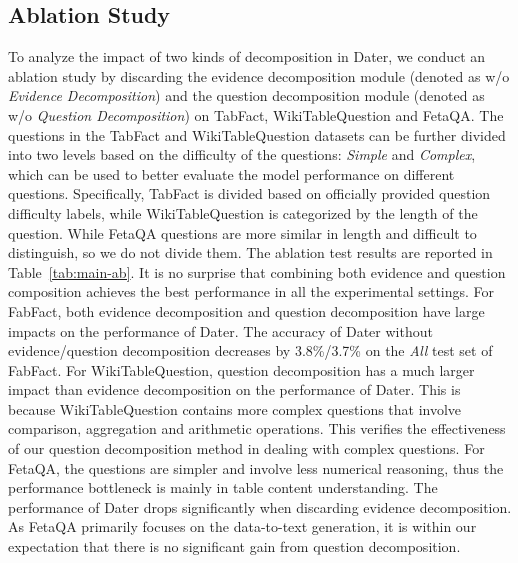 \documentclass{article}
\begin{document}
\subsection{Ablation Study}
To analyze the impact of two kinds of decomposition in Dater, we conduct an ablation study by discarding the evidence decomposition module (denoted as w/o \textit{Evidence Decomposition}) and the question decomposition module (denoted as w/o \textit{Question Decomposition}) on TabFact, WikiTableQuestion and FetaQA. The questions in the TabFact and WikiTableQuestion datasets can be further divided into two levels based on the difficulty of the questions:  \textit{Simple} and \textit{Complex}, which can be used to better evaluate the model performance on different questions. 
Specifically, TabFact is divided based on officially provided question difficulty labels, while WikiTableQuestion is categorized by the length of the question.  
While FetaQA questions are more similar in length and difficult to distinguish, so we do not divide them.
The ablation test results are reported in Table~\ref{tab:main-ab}. 
It is no surprise that combining both evidence and question composition achieves the best performance in all the experimental settings.
For FabFact, both evidence decomposition and question decomposition have large impacts on the performance of Dater. The accuracy of Dater without evidence/question decomposition decreases by 3.8\%/3.7\% on the \textit{All} test set of FabFact. For WikiTableQuestion, question decomposition has a much larger impact than evidence decomposition on the performance of Dater. This is because WikiTableQuestion contains more complex questions that involve comparison, aggregation and arithmetic operations. This verifies the effectiveness of our question decomposition method in dealing with complex questions. 
For FetaQA, the questions are simpler and involve less numerical reasoning, thus the performance bottleneck is mainly in table content understanding. The performance of Dater drops significantly when discarding evidence decomposition. 
As FetaQA primarily focuses on the data-to-text generation, it is within our expectation that there is no significant gain from question decomposition. 
\end{document}
